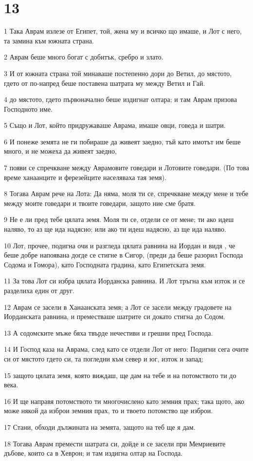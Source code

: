 \chapter{13}

\par 1 Така Аврам излезе от Египет, той, жена му и всичко що имаше, и Лот с него, та замина към южната страна.
\par 2 Аврам беше много богат с добитък, сребро и злато.
\par 3 И от южната страна той минаваше постепенно дори до Ветил, до мястото, гдето от по-напред беше поставена шатрата му между Ветил и Гай.
\par 4 до мястото, гдето първоначално беше издигнат олтара; и там Аврам призова Господното име.
\par 5 Също и Лот, който придружаваше Аврама, имаше овци, говеда и шатри.
\par 6 И понеже земята не ги побираше да живеят заедно, тъй като имотът им беше много, и не можеха да живеят заедно,
\par 7 появи се спречкване между Аврамовите говедари и Лотовите говедари. (По това време ханаанците и ферезейците населяваха тая земя).
\par 8 Тогава Аврам рече на Лота: Да няма, моля ти се, спречкване между мене и тебе между моите говедари и твоите говедари, защото ние сме братя.
\par 9 Не е ли пред тебе цялата земя. Моля ти се, отдели се от мене; ти ако идеш наляво, то аз ще ида надясно; или ако ти идеш надясно, аз ще ида наляво.
\par 10 Лот, прочее, подигна очи и разгледа цялата равнина на Иордан и видя , че беше добре напоявана догде се стигне в Сигор, (преди да беше разорил Господа Содома и Гомора), като Господната градина, като Египетската земя.
\par 11 За това Лот си избра цялата Иорданска равнина. И Лот тръгна към изток и се разделиха един от друг.
\par 12 Аврам се засели в Ханаанската земя; а Лот се засели между градовете на Иорданската равнина, и преместваше шатрите си докато стигна до Содом.
\par 13 А содомските мъже бяха твърде нечестиви и грешни пред Господа.
\par 14 И Господ каза на Аврама, след като се отдели Лот от него: Подигни сега очите си от мястото гдето си, та погледни към север и юг, изток и запад;
\par 15 защото цялата земя, която виждаш, ще дам на тебе и на потомството ти до века.
\par 16 И ще направя потомството ти многочислено като земния прах; така щото, ако може някой да изброи земния прах, то и твоето потомство ще изброи.
\par 17 Стани, обходи дължината на земята, защото на теб ще я дам.
\par 18 Тогава Аврам премести шатрата си, дойде и се засели при Мемриевите дъбове, които са в Хеврон; и там издигна олтар на Господа.

